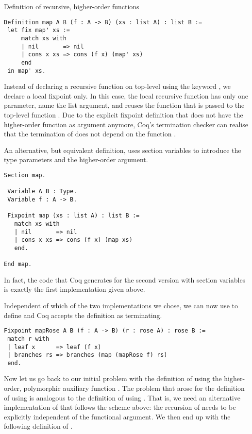 \begin{excursus}{Definition of recursive, higher-order functions}
\begin{verbatim}
Definition map A B (f : A -> B) (xs : list A) : list B :=
 let fix map' xs :=
     match xs with
     | nil       => nil
     | cons x xs => cons (f x) (map' xs)
     end
 in map' xs.
\end{verbatim}

Instead of declaring a recursive function on top-level using the keyword , we declare a local fixpoint only.
In this case, the local recursive function  has only one parameter, name the list argument, and reuses the function  that is passed to the top-level function .
Due to the explicit fixpoint definition that does not have the higher-order function as argument anymore, Coq's termination checker can realise that the termination of  does not depend on the function .

An alternative, but equivalent definition, uses section variables to introduce the type parameters and the higher-order argument.

\begin{verbatim}
Section map.

 Variable A B : Type.
 Variable f : A -> B.

 Fixpoint map (xs : list A) : list B :=
   match xs with
   | nil       => nil
   | cons x xs => cons (f x) (map xs)
   end.

End map.
\end{verbatim}

In fact, the code that Coq generates for the second version with section variables is exactly the first implementation given above.

Independent of which of the two implementations we chose, we can now use  to define  and Coq accepts the definition as terminating.

\begin{verbatim}
Fixpoint mapRose A B (f : A -> B) (r : rose A) : rose B :=
 match r with
 | leaf x      => leaf (f x)
 | branches rs => branches (map (mapRose f) rs)
 end.
\end{verbatim}
\end{excursus}

Now let us go back to our initial problem with the definition of  using the higher-order, polymorphic auxiliary function .
The problem that arose for the definition of  using  is analogous to the definition of  using .
That is, we need an alternative implementation of  that follows the scheme above: the recursion of  needs to be explicitly independent of the functional argument.
We then end up with the following definition of .

